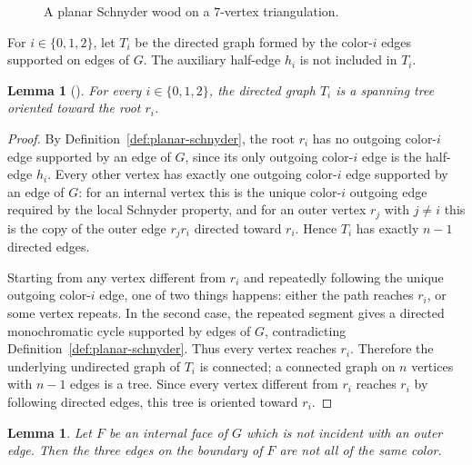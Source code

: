 \documentclass[11pt]{amsart}
\newcommand{\Zthree}{\{0,1,2\}}
\theoremstyle{plain}
\newtheorem{lemma}[theorem]{Lemma}
\theoremstyle{definition}
\theoremstyle{remark}
\begin{document}
\begin{figure}[ht]
\caption{A planar Schnyder wood on a $7$-vertex triangulation.}
\label{fig:planar-schnyder-example}
\end{figure}

For $i \in \Zthree$, let $T_i$ be the directed graph formed by the color-$i$ edges supported on edges of $G$. The auxiliary half-edge $h_i$ is not included in $T_i$.

\begin{lemma}[\cite{schnyder1989}]
\label{lem:planar-tree-property}
For every $i \in \Zthree$, the directed graph $T_i$ is a spanning tree oriented toward the root $r_i$.
\end{lemma}

\begin{proof}
By Definition~\ref{def:planar-schnyder}, the root $r_i$ has no outgoing color-$i$ edge supported by an edge of $G$, since its only outgoing color-$i$ edge is the half-edge $h_i$. Every other vertex has exactly one outgoing color-$i$ edge supported by an edge of $G$: for an internal vertex this is the unique color-$i$ outgoing edge required by the local Schnyder property, and for an outer vertex $r_j$ with $j \neq i$ this is the copy of the outer edge $r_j r_i$ directed toward $r_i$. Hence $T_i$ has exactly $n-1$ directed edges.

Starting from any vertex different from $r_i$ and repeatedly following the unique outgoing color-$i$ edge, one of two things happens: either the path reaches $r_i$, or some vertex repeats. In the second case, the repeated segment gives a directed monochromatic cycle supported by edges of $G$, contradicting Definition~\ref{def:planar-schnyder}. Thus every vertex reaches $r_i$. Therefore the underlying undirected graph of $T_i$ is connected; a connected graph on $n$ vertices with $n-1$ edges is a tree. Since every vertex different from $r_i$ reaches $r_i$ by following directed edges, this tree is oriented toward $r_i$.
\end{proof}

\begin{lemma}
\label{lem:planar-no-monochromatic-face}
Let $F$ be an internal face of $G$ which is not incident with an outer edge. Then the three edges on the boundary of $F$ are not all of the same color.
\end{lemma}
\end{document}
